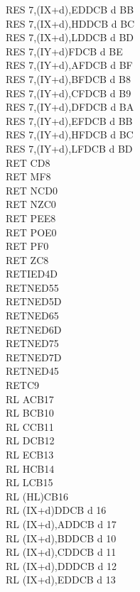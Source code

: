 \documentclass[12pt,twoside,openright,a4paper]{book}
\begin{document}
\begin{multicols}{3}
{\begin{tabbing}
		RES 7,(IX+d),E\UNDOC\>DDCB d BB\\
		RES 7,(IX+d),H\UNDOC\>DDCB d BC\\
		RES 7,(IX+d),L\UNDOC\>DDCB d BD\\
		RES 7,(IY+d)\>FDCB d BE\\
		RES 7,(IY+d),A\UNDOC\>FDCB d BF\\
		RES 7,(IY+d),B\UNDOC\>FDCB d B8\\
		RES 7,(IY+d),C\UNDOC\>FDCB d B9\\
		RES 7,(IY+d),D\UNDOC\>FDCB d BA\\
		RES 7,(IY+d),E\UNDOC\>FDCB d BB\\
		RES 7,(IY+d),H\UNDOC\>FDCB d BC\\
		RES 7,(IY+d),L\UNDOC\>FDCB d BD\\
		RET C\>D8\\
		RET M\>F8\\
		RET NC\>D0\\
		RET NZ\>C0\\
		RET PE\>E8\\
		RET PO\>E0\\
		RET P\>F0\\
		RET Z\>C8\\
		RETI\>ED4D\\
		RETN\UNDOC\>ED55\\
		RETN\UNDOC\>ED5D\\
		RETN\UNDOC\>ED65\\
		RETN\UNDOC\>ED6D\\
		RETN\UNDOC\>ED75\\
		RETN\UNDOC\>ED7D\\
		RETN\>ED45\\
		RET\>C9\\
		RL A\>CB17\\
		RL B\>CB10\\
		RL C\>CB11\\
		RL D\>CB12\\
		RL E\>CB13\\
		RL H\>CB14\\
		RL L\>CB15\\
		RL (HL)\>CB16\\
		RL (IX+d)\>DDCB d 16\\
		RL (IX+d),A\UNDOC\>DDCB d 17\\
		RL (IX+d),B\UNDOC\>DDCB d 10\\
		RL (IX+d),C\UNDOC\>DDCB d 11\\
		RL (IX+d),D\UNDOC\>DDCB d 12\\
		RL (IX+d),E\UNDOC\>DDCB d 13\\

\end{tabbing}}
\end{multicols}
\end{document}
